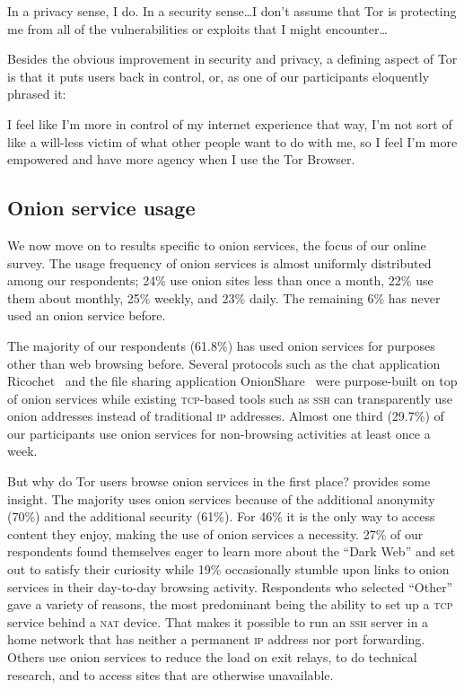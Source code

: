 \begin{displayquote}[P06]
In a privacy sense, I do. In a security sense\ldots I don't assume that Tor is
protecting me from all of the vulnerabilities or exploits that I might
encounter\ldots
\end{displayquote}

Besides the obvious improvement in security and privacy, a defining aspect of
Tor is that it puts users back in control, or, as one of our participants
eloquently phrased it:

\begin{displayquote}[P02]
I feel like I'm more in control of my internet experience that way, I'm not sort
of like a will-less victim of what other people want to do with me, so I feel
I'm more empowered and have more agency when I use the Tor Browser.
\end{displayquote}

\subsection{Onion service usage}

We now move on to results specific to onion services, the focus of our online
survey.  The usage frequency of onion services is almost uniformly distributed
among our respondents; 24\% use onion sites less than once a month, 22\% use
them about monthly, 25\% weekly, and 23\% daily.  The remaining 6\% has never
used an onion service before.

The majority of our respondents (61.8\%) has used onion services for purposes
other than web browsing before.  Several protocols such as the chat application
Ricochet~\cite{ricochet} and the file sharing application
OnionShare~\cite{onionshare} were purpose-built on top of onion services while
existing \textsc{tcp}-based tools such as \textsc{ssh} can transparently use
onion addresses instead of traditional \textsc{ip} addresses.  Almost one third
(29.7\%) of our participants use onion services for non-browsing activities at
least once a week.

But why do Tor users browse onion services in the first place?
 provides some insight.  The majority uses onion services
because of the additional anonymity (70\%) and the additional security (61\%).
For 46\% it is the only way to access content they enjoy, making the use of
onion services a necessity.  27\% of our respondents found themselves eager to
learn more about the ``Dark Web'' and set out to satisfy their curiosity while
19\% occasionally stumble upon links to onion services in their day-to-day
browsing activity.  Respondents who selected ``Other'' gave a variety of
reasons, the most predominant being the ability to set up a \textsc{tcp} service
behind a \textsc{nat} device.  That makes it possible to run an \textsc{ssh}
server in a home network that has neither a permanent \textsc{ip} address nor
port forwarding.  Others use onion services to reduce the load on exit relays,
to do technical research, and to access sites that are otherwise unavailable.

